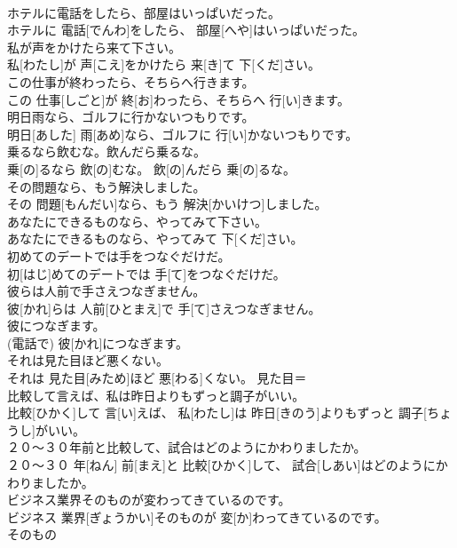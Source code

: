 \documentclass[8pt]{extreport}
\begin{document}
\begin{CJK}{UTF8}{min}
\\	ホテルに電話をしたら、部屋はいっぱいだった。	
\\	ホテルに 電話[でんわ]をしたら、 部屋[へや]はいっぱいだった。	
\\	私が声をかけたら来て下さい。	
\\	私[わたし]が 声[こえ]をかけたら 来[き]て 下[くだ]さい。	
\\	この仕事が終わったら、そちらへ行きます。	
\\	この 仕事[しごと]が 終[お]わったら、そちらへ 行[い]きます。	
\\	明日雨なら、ゴルフに行かないつもりです。	
\\	明日[あした] 雨[あめ]なら、ゴルフに 行[い]かないつもりです。	
\\	乗るなら飲むな。飲んだら乗るな。	
\\	乗[の]るなら 飲[の]むな。 飲[の]んだら 乗[の]るな。	
\\	その問題なら、もう解決しました。	
\\	その 問題[もんだい]なら、もう 解決[かいけつ]しました。	
\\	あなたにできるものなら、やってみて下さい。	
\\	あなたにできるものなら、やってみて 下[くだ]さい。	
\\	初めてのデートでは手をつなぐだけだ。	
\\	初[はじ]めてのデートでは 手[て]をつなぐだけだ。	
\\	彼らは人前で手さえつなぎません。	
\\	彼[かれ]らは 人前[ひとまえ]で 手[て]さえつなぎません。	
\\	彼につなぎます。	
\\	(電話で)	彼[かれ]につなぎます。	
\\	それは見た目ほど悪くない。	
\\	それは 見た目[みため]ほど 悪[わる]くない。	見た目＝ 
\\	比較して言えば、私は昨日よりもずっと調子がいい。	
\\	比較[ひかく]して 言[い]えば、 私[わたし]は 昨日[きのう]よりもずっと 調子[ちょうし]がいい。	
\\	２０〜３０年前と比較して、試合はどのようにかわりましたか。	
\\	２０〜３０ 年[ねん] 前[まえ]と 比較[ひかく]して、 試合[しあい]はどのようにかわりましたか。	
\\	ビジネス業界そのものが変わってきているのです。	
\\	ビジネス 業界[ぎょうかい]そのものが 変[か]わってきているのです。	
\\	そのもの 

\end{CJK}
\end{document}

